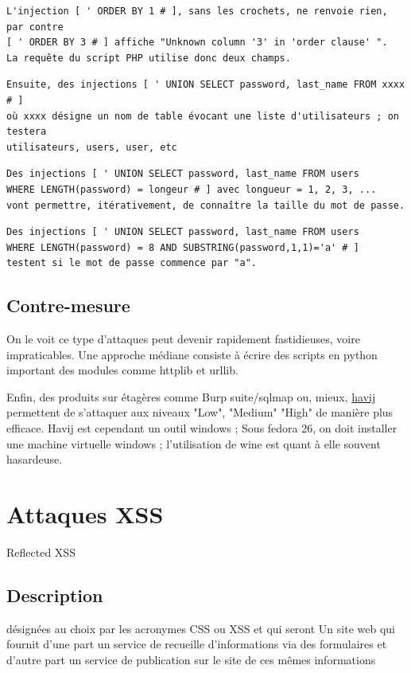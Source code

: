 \begin{verbatim}
L'injection [ ' ORDER BY 1 # ], sans les crochets, ne renvoie rien,  par contre 
[ ' ORDER BY 3 # ] affiche "Unknown column '3' in 'order clause' ". 
La requête du script PHP utilise donc deux champs.
\end{verbatim} 

\begin{verbatim}
Ensuite, des injections [ ' UNION SELECT password, last_name FROM xxxx # ]
où xxxx désigne un nom de table évocant une liste d'utilisateurs ; on testera
utilisateurs, users, user, etc
\end{verbatim} 

\begin{verbatim}
Des injections [ ' UNION SELECT password, last_name FROM users 
WHERE LENGTH(password) = longeur # ] avec longueur = 1, 2, 3, ... 
vont permettre, itérativement, de connaître la taille du mot de passe.
\end{verbatim} 

\begin{verbatim}
Des injections [ ' UNION SELECT password, last_name FROM users 
WHERE LENGTH(password) = 8 AND SUBSTRING(password,1,1)='a' # ] 
testent si le mot de passe commence par "a".
\end{verbatim} 
\subsection{Contre-mesure}

On le voit ce type d'attaques peut devenir rapidement fastidieuses, voire impraticables. Une approche médiane consiste à écrire des scripts en python important des modules comme httplib et urllib.

Enfin, des produits sur étagères comme Burp suite/sqlmap ou, mieux,   \href{www.itsecteam.com}{havij} permettent de s'attaquer aux niveaux "Low", "Medium" "High" de manière plus efficace. Havij est cependant un outil windows ; Sous fedora 26, on doit installer une machine virtuelle windows ;  l'utilisation de wine est quant à elle souvent hasardeuse.


\section{Attaques XSS }Reflected XSS

\subsection{Description}
 désignées au choix par les acronymes CSS ou XSS et qui seront
Un site web qui fournit d'une part un service de recueille d'informations via des formulaires et d'autre part un service de publication sur le site de ces mêmes informations
